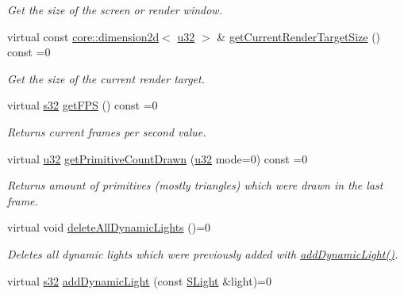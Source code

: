 \begin{DoxyCompactItemize}
\begin{DoxyCompactList}\small\item\em Get the size of the screen or render window. \end{DoxyCompactList}\item 
virtual const \hyperlink{classirr_1_1core_1_1dimension2d}{core\+::dimension2d}$<$ \hyperlink{namespaceirr_a0416a53257075833e7002efd0a18e804}{u32} $>$ \& \hyperlink{classirr_1_1video_1_1IVideoDriver_a76fc2aba131b5986d07d92c6888cfc0c}{get\+Current\+Render\+Target\+Size} () const =0
\begin{DoxyCompactList}\small\item\em Get the size of the current render target. \end{DoxyCompactList}\item 
virtual \hyperlink{namespaceirr_ac66849b7a6ed16e30ebede579f9b47c6}{s32} \hyperlink{classirr_1_1video_1_1IVideoDriver_a5b71428402c0b6a3b18b8f2fa408af13}{get\+F\+PS} () const =0
\begin{DoxyCompactList}\small\item\em Returns current frames per second value. \end{DoxyCompactList}\item 
virtual \hyperlink{namespaceirr_a0416a53257075833e7002efd0a18e804}{u32} \hyperlink{classirr_1_1video_1_1IVideoDriver_a2ce9be45cacb4aa034d3afdb489a57a3}{get\+Primitive\+Count\+Drawn} (\hyperlink{namespaceirr_a0416a53257075833e7002efd0a18e804}{u32} mode=0) const =0
\begin{DoxyCompactList}\small\item\em Returns amount of primitives (mostly triangles) which were drawn in the last frame. \end{DoxyCompactList}\item 
\mbox{\label{classirr_1_1video_1_1IVideoDriver_ab1bd29567ef6eb31a43bebe04c47eb5e}} 
virtual void \hyperlink{classirr_1_1video_1_1IVideoDriver_ab1bd29567ef6eb31a43bebe04c47eb5e}{delete\+All\+Dynamic\+Lights} ()=0
\begin{DoxyCompactList}\small\item\em Deletes all dynamic lights which were previously added with \hyperlink{classirr_1_1video_1_1IVideoDriver_a813a39352eae26c4d30b5882618639be}{add\+Dynamic\+Light()}. \end{DoxyCompactList}\item 
virtual \hyperlink{namespaceirr_ac66849b7a6ed16e30ebede579f9b47c6}{s32} \hyperlink{classirr_1_1video_1_1IVideoDriver_a813a39352eae26c4d30b5882618639be}{add\+Dynamic\+Light} (const \hyperlink{structirr_1_1video_1_1SLight}{S\+Light} \&light)=0

\end{DoxyCompactItemize}
